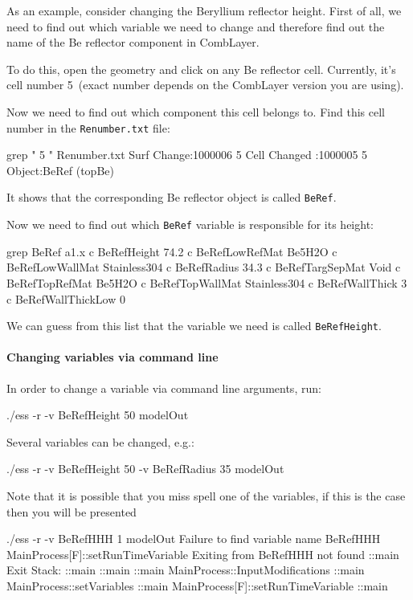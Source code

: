 As an example, consider changing the Beryllium reflector height.
First of all, we need to find out which variable we need to change and therefore find out the name of the Be reflector
component in CombLayer.

To do this, open the \mcnp geometry and click on any Be reflector cell. Currently, it's cell number 5~(exact number depends on the
CombLayer version you are using).

Now we need to find out which component this cell belongs to.  Find this cell number in the {\tt Renumber.txt} file:
\begin{bash}
grep " 5 " Renumber.txt 
Surf Change:1000006 5                                                           
Cell Changed :1000005 5 Object:BeRef (topBe)       
\end{bash}
It shows that the corresponding Be reflector object is called {\tt BeRef}.

Now we need to find out which {\tt BeRef} variable is responsible for its height:
\begin{bash}
grep BeRef a1.x 
c BeRefHeight 74.2
c BeRefLowRefMat Be5H2O
c BeRefLowWallMat Stainless304
c BeRefRadius 34.3
c BeRefTargSepMat Void
c BeRefTopRefMat Be5H2O
c BeRefTopWallMat Stainless304
c BeRefWallThick 3
c BeRefWallThickLow 0
\end{bash}

We can guess from this list that the variable we need is called {\tt BeRefHeight}.

\paragraph[Command line]{Changing variables via command line}
In order to change a variable via command line arguments, run:
\begin{bash}
  ./ess -r -v BeRefHeight 50 modelOut
\end{bash}
Several variables can be changed, e.g.:
\begin{bash}
  ./ess -r -v BeRefHeight 50 -v BeRefRadius 35 modelOut
\end{bash}

Note that it is possible that you miss spell one of the variables, if this is the case then
you will be presented 

\begin{bash}
./ess -r -v BeRefHHH 1 modelOut
Failure to find variable name BeRefHHH             MainProcess[F]::setRunTimeVariable
Exiting from BeRefHHH not found                    ::main
Exit Stack:                                        ::main
::main                                             ::main
  MainProcess::InputModifications                  ::main
    MainProcess::setVariables                      ::main
      MainProcess[F]::setRunTimeVariable           ::main
\end{bash}

